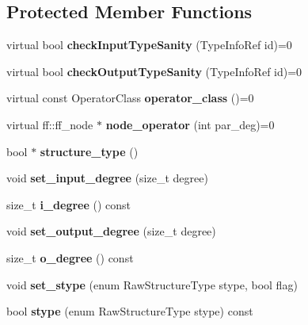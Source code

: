 \subsection*{\-Protected \-Member \-Functions}
\begin{DoxyCompactItemize}
\item 
\hypertarget{class_operator_a6af729a9d00cab0f62cf0e3de2548d39}{virtual bool {\bfseries check\-Input\-Type\-Sanity} (\-Type\-Info\-Ref id)=0}\label{class_operator_a6af729a9d00cab0f62cf0e3de2548d39}

\item 
\hypertarget{class_operator_aeacd17ae40fc541ee6a960ee45e405e6}{virtual bool {\bfseries check\-Output\-Type\-Sanity} (\-Type\-Info\-Ref id)=0}\label{class_operator_aeacd17ae40fc541ee6a960ee45e405e6}

\item 
\hypertarget{class_operator_a5b7ccb315884468f1683e83b3539f400}{virtual const \-Operator\-Class {\bfseries operator\-\_\-class} ()=0}\label{class_operator_a5b7ccb315884468f1683e83b3539f400}

\item 
\hypertarget{class_operator_acc7b41fbc84974564d51d3bbb152c2d8}{virtual ff\-::ff\-\_\-node $\ast$ {\bfseries node\-\_\-operator} (int par\-\_\-deg)=0}\label{class_operator_acc7b41fbc84974564d51d3bbb152c2d8}

\item 
\hypertarget{class_operator_a2f0f76f195ffd9ee8f1fce2da7956926}{bool $\ast$ {\bfseries structure\-\_\-type} ()}\label{class_operator_a2f0f76f195ffd9ee8f1fce2da7956926}

\item 
\hypertarget{class_operator_a220b5efebda50b93c7fb29d997a12413}{void {\bfseries set\-\_\-input\-\_\-degree} (size\-\_\-t degree)}\label{class_operator_a220b5efebda50b93c7fb29d997a12413}

\item 
\hypertarget{class_operator_a49dbe907baab7d9d5ae44c96074fe873}{size\-\_\-t {\bfseries i\-\_\-degree} () const }\label{class_operator_a49dbe907baab7d9d5ae44c96074fe873}

\item 
\hypertarget{class_operator_a398b346d10ab14d3cb80e5b600219ff9}{void {\bfseries set\-\_\-output\-\_\-degree} (size\-\_\-t degree)}\label{class_operator_a398b346d10ab14d3cb80e5b600219ff9}

\item 
\hypertarget{class_operator_a8f4deb310b1665ae300aa3389d7b58b6}{size\-\_\-t {\bfseries o\-\_\-degree} () const }\label{class_operator_a8f4deb310b1665ae300aa3389d7b58b6}

\item 
\hypertarget{class_operator_aa690c335fa31d9b85f9c2e6271a0b018}{void {\bfseries set\-\_\-stype} (enum \-Raw\-Structure\-Type stype, bool flag)}\label{class_operator_aa690c335fa31d9b85f9c2e6271a0b018}

\item 
\hypertarget{class_operator_a910957044131a074f4fa7be8577a900a}{bool {\bfseries stype} (enum \-Raw\-Structure\-Type stype) const }\label{class_operator_a910957044131a074f4fa7be8577a900a}

\end{DoxyCompactItemize}
